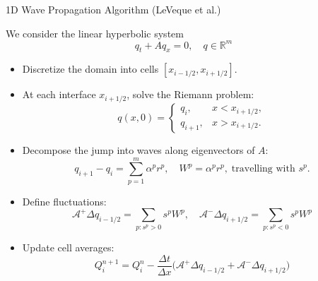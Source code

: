 


\begin{frame}{1D Wave Propagation Algorithm (LeVeque et al.)}
	\scriptsize
	
	We consider the linear hyperbolic system
	\[
	q_t + Aq_x = 0, \quad q \in \mathbb{R}^m
	\]
	
	\begin{itemize}
		\item Discretize the domain into cells $[x_{i-1/2}, x_{i+1/2}]$.
		\item At each interface $x_{i+1/2}$, solve the Riemann problem:
		\[
		q(x,0) = 
		\begin{cases} 
			q_i, & x < x_{i+1/2}, \\ 
			q_{i+1}, & x > x_{i+1/2}.
		\end{cases}
		\]
		\item Decompose the jump into waves along eigenvectors of $A$:
		\[
		q_{i+1} - q_i = \sum_{p=1}^m \alpha^p r^p, 
		\quad W^p = \alpha^p r^p, \; \text{travelling with } s^p.
		\]
		\pause
		\item Define fluctuations:
		\[
		\mathcal{A}^+ \Delta q_{i-1/2} = \sum_{p: s^p>0} s^p W^p, \quad
		\mathcal{A}^- \Delta q_{i+1/2} = \sum_{p: s^p<0} s^p W^p
		\]
		\item Update cell averages:
		\[
		Q_i^{n+1} = Q_i^n - \frac{\Delta t}{\Delta x} 
		\Big( \mathcal{A}^+ \Delta q_{i-1/2} + \mathcal{A}^- \Delta q_{i+1/2} \Big)
		\]
	\end{itemize}
\end{frame}





